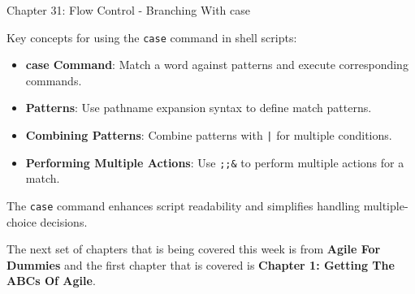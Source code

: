 \begin{notes}{Chapter 31: Flow Control - Branching With case}
\begin{highlight}
    \end{highlight}
    
    \begin{highlight}
    
        Key concepts for using the \texttt{case} command in shell scripts:
        
        \begin{itemize}
            \item \textbf{case Command}: Match a word against patterns and execute corresponding commands.
            \item \textbf{Patterns}: Use pathname expansion syntax to define match patterns.
            \item \textbf{Combining Patterns}: Combine patterns with \texttt{|} for multiple conditions.
            \item \textbf{Performing Multiple Actions}: Use \texttt{;;&} to perform multiple actions for a match.
        \end{itemize}
        
        The \texttt{case} command enhances script readability and simplifies handling multiple-choice decisions.
    
    \end{highlight}
\end{notes}

The next set of chapters that is being covered this week is from \textbf{Agile For Dummies} and the first chapter that is covered is \textbf{Chapter 1: Getting The ABCs Of Agile}.

